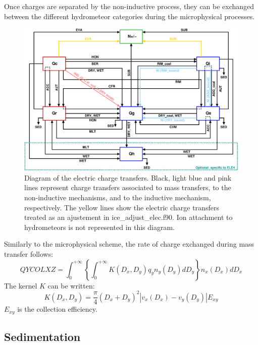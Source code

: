 Once charges are separated by the non-inductive process, they can be exchanged between the different hydrometeor categories during the microphysical processes.

\begin{figure}[h]
  \begin{center}
     \includegraphics[width=16cm]{./EPS/charge_transfer.eps}
  \end{center}
  \caption{Diagram of the electric charge transfers. Black, light blue and pink lines represent charge transfers associated to mass transfers, to the non-inductive mechanisms, and to the inductive mechanism, respectively. The yellow lines show the electric charge transfers treated as an ajustement in ice\_adjust\_elec.f90. Ion attachment to hydrometeors is not represented in this diagram.}
  \label{fig:transfer}
\end{figure}

Similarly to the microphysical scheme, the rate of charge exchanged during mass transfer follows:
\begin{equation}
  QYCOLXZ = \int_0 ^{+ \infty} \left\{
            \int_0 ^{+ \infty} K(D_x , D_y) q_y n_y (D_y) dD_y \right\} n_x (D_x) dD_x
\end{equation}
The kernel $K$ can be written:
\begin{equation}
  K(D_x , D_y) = \frac{\pi}{4} (D_x + D_y)^2 |v_x (D_x) - v_y (D_y)| E_{xy}
\end{equation}
$E_{xy}$ is the collection efficiency.

\subsection{Sedimentation}

